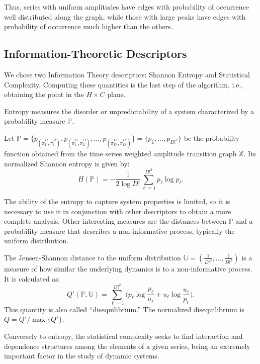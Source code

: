 \documentclass[journal]{IEEEtran}
\begin{document}
Thus, series with uniform amplitudes have edges with probability of occurrence well distributed along the graph, while those with large peaks have edges with probability of occurrence much higher than the others.

\subsection{Information-Theoretic Descriptors}\label{HC}

We chose two Information Theory descriptors: Shannon Entropy and Statistical Complexity.
Computing these quantities is the last step of the algorithm, i.e., obtaining the point in the $H \times C$ plane.

Entropy measures the disorder or unpredictability of a system characterized by a probability measure $\mathbb{P}$.

Let $\mathbb{P} = \{p_{(\widetilde\pi^D_1, \widetilde\pi^D_1)}, p_{(\widetilde\pi^D_1, \widetilde\pi^D_2)}, \dots, p_{(\widetilde\pi^D_{D!}, \widetilde\pi^D_{D!})} \} = \{p_1,\dots,p_{D!^2}\}$ be the probability function obtained from the time series weighted amplitude transition graph $\mathbb{X}$.
Its normalized Shannon entropy is given by:	
\begin{equation}
H(\mathbb{P}) = -\frac1{2\log D!}\sum_{\ell=1}^{D!^2} p_{\ell} \log p_{\ell} .
\label{eq:Entropia}
\end{equation}

The ability of the entropy to capture system properties is limited, so it is necessary to use it in conjunction with other des\-criptors to obtain a more complete analysis.
Other interesting measures are the distances between $\mathbb{P}$ and a probability measure that describes a non-informative process, typically the uniform distribution.

The Jensen-Shannon distance to the uniform distribution $\mathbb{U} = (\frac{1}{D!^2}, \dots, \frac{1}{D!^2})$ is a measure of how similar the underlying dynamics is to a non-informative process.
It is calculated as:
\begin{equation}
Q'(\mathbb{P}, \mathbb{U}) = \sum_{\ell=1}^{D!^2} \Big(p_\ell \log\frac{p_\ell}{u_\ell} +
u_\ell \log\frac{u_\ell}{p_\ell}
\Big).
\end{equation}
This quantity is also called ``disequilibrium.''
The normalized disequilibrium is $ Q=Q'/\max\{Q'\}$.

Conversely to entropy, the statistical complexity seeks to find interaction and dependence structures among the elements of a given series, being an extremely important factor in the study of dynamic systems.
\end{document}
